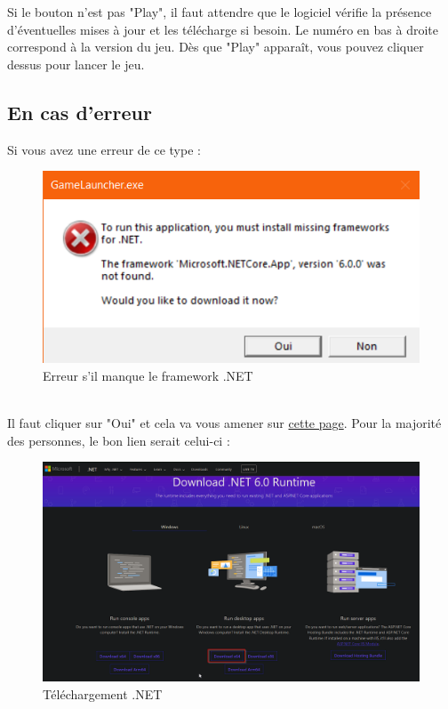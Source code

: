 \documentclass[a4paper, 10pt]{article}
\begin{document}
	Si le bouton n'est pas "Play", il faut attendre que le logiciel vérifie la présence d'éventuelles mises à jour et les télécharge si besoin. Le numéro en bas à droite correspond à la version du jeu. Dès que "Play" apparaît, vous pouvez cliquer dessus pour lancer le jeu.
	
	\subsection{En cas d'erreur}
	Si vous avez une erreur de ce type : 
	\begin{figure}[ht]
		\centering
		\includegraphics[scale=0.5]{images/erreur.png}
		\caption{Erreur s'il manque le framework .NET}
	\end{figure}
	\\
	Il faut cliquer sur "Oui" et cela va vous amener sur \href{https://dotnet.microsoft.com/en-us/download/dotnet/6.0/runtime?cid=getdotnetcore}{cette page}.
	Pour la  majorité des personnes, le bon lien serait celui-ci : 
	\begin{figure}[ht]
		\centering
		\includegraphics[scale=0.4]{images/dotnet.png}
		\caption{Téléchargement .NET}
	\end{figure}
	
\end{document}
